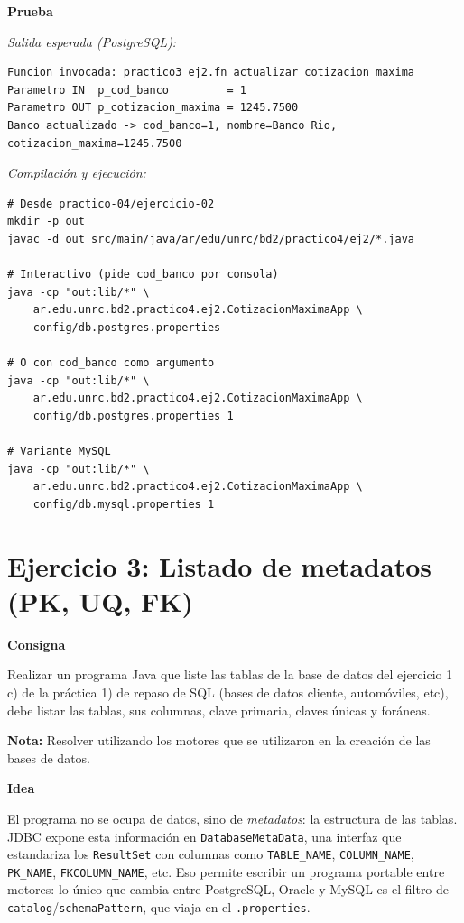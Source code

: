\documentclass[11pt,a4paper]{article}
\newcommand{\itemcabecera}[1]{\noindent\textbf{#1}\par\medskip}
\newcommand{\bloqueConsigna}{\itemcabecera{Consigna}}
\newcommand{\bloqueIdea}{\itemcabecera{Idea}}
\newcommand{\bloquePrueba}{\itemcabecera{Prueba}}
\begin{document}
\bloquePrueba

\textit{Salida esperada (PostgreSQL):}

\begin{lstlisting}[style=shellstyle]
Funcion invocada: practico3_ej2.fn_actualizar_cotizacion_maxima
Parametro IN  p_cod_banco         = 1
Parametro OUT p_cotizacion_maxima = 1245.7500
Banco actualizado -> cod_banco=1, nombre=Banco Rio, cotizacion_maxima=1245.7500
\end{lstlisting}

\textit{Compilación y ejecución:}

\begin{lstlisting}[style=shellstyle]
# Desde practico-04/ejercicio-02
mkdir -p out
javac -d out src/main/java/ar/edu/unrc/bd2/practico4/ej2/*.java

# Interactivo (pide cod_banco por consola)
java -cp "out:lib/*" \
    ar.edu.unrc.bd2.practico4.ej2.CotizacionMaximaApp \
    config/db.postgres.properties

# O con cod_banco como argumento
java -cp "out:lib/*" \
    ar.edu.unrc.bd2.practico4.ej2.CotizacionMaximaApp \
    config/db.postgres.properties 1

# Variante MySQL
java -cp "out:lib/*" \
    ar.edu.unrc.bd2.practico4.ej2.CotizacionMaximaApp \
    config/db.mysql.properties 1
\end{lstlisting}

\section{Ejercicio 3: Listado de metadatos (PK, UQ, FK)}

\bloqueConsigna

Realizar un programa Java que liste las tablas de la base de datos del ejercicio 1 c) de la práctica 1) de repaso de SQL (bases de datos cliente, automóviles, etc), debe listar las tablas, sus columnas, clave primaria, claves únicas y foráneas.

\textbf{Nota:} Resolver utilizando los motores que se utilizaron en la creación de las bases de datos.

\bloqueIdea

El programa no se ocupa de datos, sino de \emph{metadatos}: la estructura de las tablas. JDBC expone esta información en \texttt{DatabaseMetaData}, una interfaz que estandariza los \texttt{ResultSet} con columnas como \texttt{TABLE\_NAME}, \texttt{COLUMN\_NAME}, \texttt{PK\_NAME}, \texttt{FKCOLUMN\_NAME}, etc. Eso permite escribir un programa portable entre motores: lo único que cambia entre PostgreSQL, Oracle y MySQL es el filtro de \texttt{catalog}/\texttt{schemaPattern}, que viaja en el \texttt{.properties}.
\end{document}
